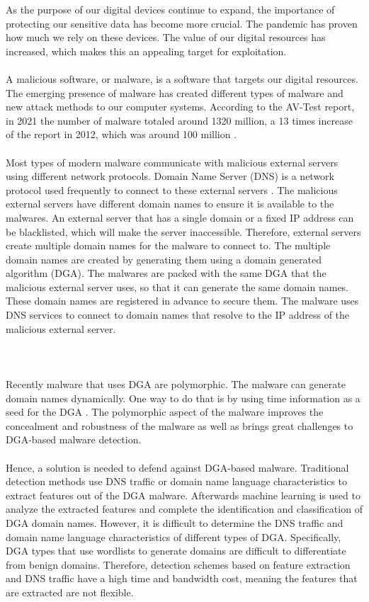 As the purpose of our digital devices continue to expand, the importance of protecting our sensitive data has become more crucial. The pandemic has proven how much we rely on these devices. The value of our digital resources has increased, which makes this an appealing target for exploitation.\\\\ 
A malicious software, or malware, is a software that targets our digital resources. The emerging presence of malware has created different types of malware and new attack methods to our computer systems. According to the AV-Test report, in 2021 the number of malware totaled around 1320 million, a 13 times increase of the report in 2012, which was around 100 million \cite{avtest}.\\\\
Most types of modern malware communicate with malicious external servers using different network protocols. Domain Name Server (DNS) is a network protocol used frequently to connect to these external servers \cite{ist}. The malicious external servers have different domain names to ensure it is available to the malwares. An external server that has a single domain or a fixed IP address can be blacklisted, which will make the server inaccessible. Therefore, external servers create multiple domain names for the malware to connect to. The multiple domain names are created by generating them using a domain generated algorithm (DGA). The malwares are packed with the same DGA that the malicious external server uses, so that it can generate the same domain names. These domain names are registered in advance to secure them. The malware uses DNS services to connect to domain names that resolve to the IP address of the malicious external server.\\\\
\pagebreak
\\\\Recently malware that uses DGA are polymorphic. The malware can generate domain names dynamically. One way to do that is by using time information as a seed for the DGA \cite{arntz_2016}. The polymorphic aspect of the malware improves the concealment and robustness of the malware as well as brings great challenges to DGA-based malware detection. \\\\ 
Hence, a solution is needed to defend against DGA-based malware. Traditional detection methods use DNS traffic or domain name language characteristics to extract features out of the DGA malware. Afterwards machine learning is used to analyze the extracted features and complete the identification and classification of DGA domain names. However, it is difficult to determine the DNS traffic and domain name language characteristics of different types of DGA. Specifically, DGA types that use wordlists to generate domains are difficult to differentiate from benign domains. Therefore, detection schemes based on feature extraction and DNS traffic have a high time and bandwidth cost, meaning the features that are extracted are not flexible. \\\\ 
